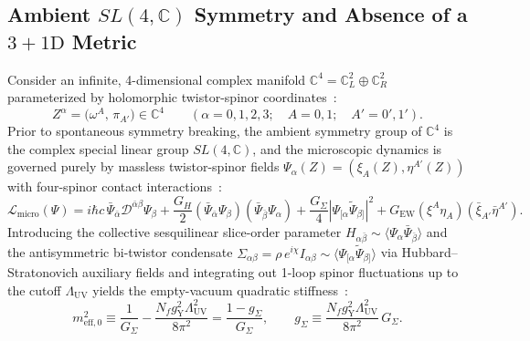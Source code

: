 \documentclass[11pt,a4paper]{article}
\begin{document}
\subsection{Ambient \texorpdfstring{$SL(4,\mathbb{C})$}{SL(4,C)} Symmetry and Absence of a \texorpdfstring{$3+1\text{D}$}{3+1D} Metric}
Consider an infinite, 4-dimensional complex manifold $\mathbb{C}^4 = \mathbb{C}^2_L \oplus \mathbb{C}^2_R$ parameterized by holomorphic twistor-spinor coordinates~\cite{Penrose1967,PenroseRindler1984,Newman1976}:
\begin{equation}
Z^\alpha = \big(\omega^A,\, \pi_{A'}\big) \in \mathbb{C}^4 \qquad (\alpha = 0,1,2,3;\quad A = 0,1;\quad A' = 0',1').
\end{equation}
Prior to spontaneous symmetry breaking, the ambient symmetry group of $\mathbb{C}^4$ is the complex special linear group $SL(4,\mathbb{C})$, and the microscopic dynamics is governed purely by massless twistor-spinor fields $\Psi_\alpha(Z) = (\xi_A(Z), \eta^{A'}(Z))$ with four-spinor contact interactions~\cite{NJL1961}:
\begin{equation}
\mathcal{L}_{\text{micro}}(\Psi) = i\hbar c\, \bar{\Psi}_{\bar{\alpha}} \mathcal{D}^{\bar{\alpha}\beta} \Psi_\beta + \frac{G_H}{2}\left(\bar{\Psi}_{\bar{\alpha}}\Psi_\beta\right)\left(\bar{\Psi}_{\bar{\beta}}\Psi_\alpha\right) + \frac{G_\Sigma}{4}\left| \Psi_{[\alpha}\tilde{\Psi}_{\beta]} \right|^2 + G_{\text{EW}}\left(\xi^A \eta_A\right)\left(\bar{\xi}_{A'}\bar{\eta}^{A'}\right).
\end{equation}
Introducing the collective sesquilinear slice-order parameter $H_{\alpha\bar{\beta}} \sim \langle \Psi_\alpha \bar{\Psi}_{\bar{\beta}}\rangle$ and the antisymmetric bi-twistor condensate $\Sigma_{\alpha\beta} = \rho\, e^{i\chi} I_{\alpha\beta} \sim \langle \Psi_{[\alpha}\tilde{\Psi}_{\beta]}\rangle$ via Hubbard--Stratonovich auxiliary fields and integrating out 1-loop spinor fluctuations up to the cutoff $\Lambda_{\text{UV}}$ yields the empty-vacuum quadratic stiffness~\cite{NJL1961,ColemanWeinberg1973}:
\begin{equation}
m_{\text{eff},0}^2 \equiv \frac{1}{G_\Sigma} - \frac{N_f g_{\text{Y}}^2 \Lambda_{\text{UV}}^2}{8\pi^2} = \frac{1 - g_\Sigma}{G_\Sigma}, \qquad g_\Sigma \equiv \frac{N_f g_{\text{Y}}^2 \Lambda_{\text{UV}}^2}{8\pi^2}\, G_\Sigma.
\end{equation}
\end{document}
